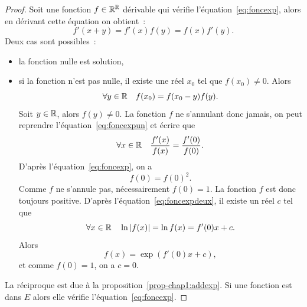 \begin{proof}
  Soit une fonction \(f \in \mathbb{R}^{\mathbb{R}}\) dérivable qui vérifie l'équation~\eqref{eq:foncexp}, alors en dérivant cette équation on obtient~:
  \begin{equation}
    \label{eq:foncexpun}
    f'(x+y)=f'(x)f(y)=f(x)f'(y).
  \end{equation}
  Deux cas sont possibles~:
  \begin{itemize}
  \item la fonction nulle est solution,
  \item si la fonction n'est pas nulle, il existe une réel \(x_0\) tel que \(f(x_0) \neq 0\). Alors
    \begin{equation}
      \forall y \in \mathbb{R} \quad f(x_0)= f(x_0-y)f(y).
    \end{equation}
    Soit \(y \in \mathbb{R}\), alors \(f(y) \neq 0\). La fonction \(f\) ne s'annulant donc jamais, on peut reprendre l'équation~\ref{eq:foncexpun} et écrire que
    \begin{equation}
      \label{eq:foncexpdeux}
      \forall x \in \mathbb{R} \quad \frac{f'(x)}{f(x)}=\frac{f'(0)}{f(0)}.
    \end{equation}
    D'après l'équation~\ref{eq:foncexp}, on a
    \begin{equation}
      f(0)=f(0)^2.
    \end{equation}
    Comme \(f\) ne s'annule pas, nécessairement \(f(0)=1\). La fonction \(f\) est donc toujours positive. D'après l'équation~\eqref{eq:foncexpdeux}, il existe un réel \(c\) tel que
    \begin{equation}
      \forall x \in \mathbb{R} \quad \ln \left\lvert f(x)\right\rvert=\ln f(x)=f'(0) x + c.
    \end{equation}
    Alors
    \begin{equation}
      f(x)=\exp(f'(0) x +c),
    \end{equation}
    et comme \(f(0)=1\), on a \(c=0\).
  \end{itemize}
  La réciproque est due à la proposition~\ref{prop-chap1:addexp}. Si une fonction est dans \(E\) alors elle vérifie l'équation~\ref{eq:foncexp}.
\end{proof}
%
